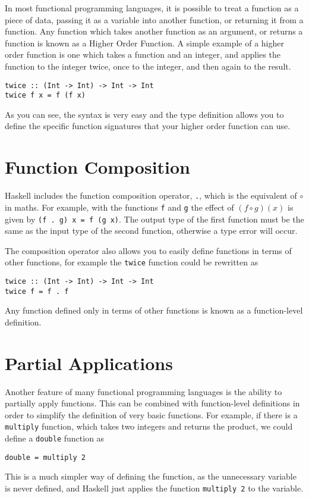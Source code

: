 
In most functional programming languages, it is possible to treat a function as a piece of data, passing it as a
 variable into another function, or returning it from a function. Any function which takes another function as an
 argument, or returns a function is known as a Higher Order Function. A simple example of a higher order function is one
 which takes a function and an integer, and applies the function to the integer twice, once to the integer, and then
 again to the result.
\begin{verbatim}
twice :: (Int -> Int) -> Int -> Int
twice f x = f (f x)
\end{verbatim}

As you can see, the syntax is very easy and the type definition allows you to define the specific function signatures
 that your higher order function can use.

\section*{Function Composition}

Haskell includes the function composition operator, \verb`.`, which is the equivalent of $\circ$ in maths. For example,
 with the functions \verb`f` and \verb`g` the effect of $(f \circ g)(x)$ is given by \verb`(f . g) x = f (g x)`. The
 output type of the first function must be the same as the input type of the second function, otherwise a type error
 will occur.

The composition operator also allows you to easily define functions in terms of other functions, for example the
 \verb`twice` function could be rewritten as
\begin{verbatim}
twice :: (Int -> Int) -> Int -> Int
twice f = f . f
\end{verbatim}
Any function defined only in terms of other functions is known as a function-level definition.

\section*{Partial Applications}

Another feature of many functional programming languages is the ability to partially apply functions. This can be
 combined with function-level definitions in order to simplify the definition of very basic functions. For example, if
 there is a \verb`multiply` function, which takes two integers and returns the product, we could define a \verb`double`
 function as
\begin{verbatim}
double = multiply 2
\end{verbatim}
This is a much simpler way of defining the function, as the unnecessary variable is never defined, and Haskell just
 applies the function \verb`multiply 2` to the variable.


